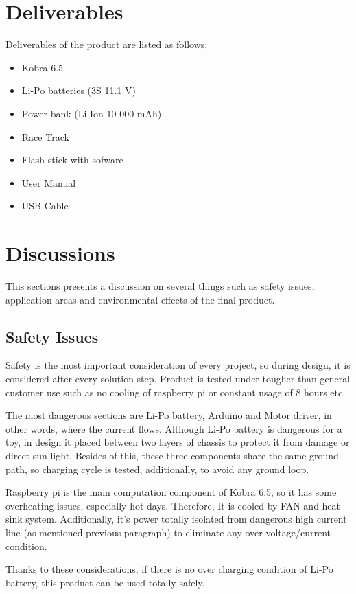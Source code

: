 \documentclass[a4paper,12pt]{article}
\begin{document}
	\newpage

	\section{Deliverables}
		Deliverables of the product are listed as follows;
		\begin{itemize}
			\item Kobra 6.5  
			\item Li-Po batteries (3S 11.1 V)
			\item Power bank (Li-Ion 10 000 mAh)
			\item Race Track 
			\item Flash stick with sofware 
			\item User Manual 
			\item USB Cable
		\end{itemize} 
	\section{Discussions}
		This sections presents a discussion on several things such as safety issues, application areas and environmental effects of the final product.
	
	\subsection{Safety Issues}
		Safety is the most important consideration of every project, so during design, it is considered after every solution step. Product is tested under tougher than general customer use such as no cooling of raspberry pi or constant usage of 8 hours etc. 
		
		The most dangerous sections are Li-Po battery, Arduino and Motor driver, in other words, where the current flows. Although Li-Po battery is dangerous for a toy, in design it placed between two layers of chassis to protect it from damage or direct sun light. Besides of this, these three components share the same ground path, so charging cycle is tested, additionally, to avoid any ground loop. 
		
		Raspberry pi is the main computation component of Kobra 6.5, so it has some overheating issues, especially hot days. Therefore, It is cooled by FAN and heat sink system. Additionally, it’s power totally isolated from dangerous high current line (as mentioned previous paragraph) to eliminate any over voltage/current condition. 
		
		Thanks to these considerations, if there is no over charging condition of Li-Po battery, this product can be used totally safely.  
		
\end{document}
